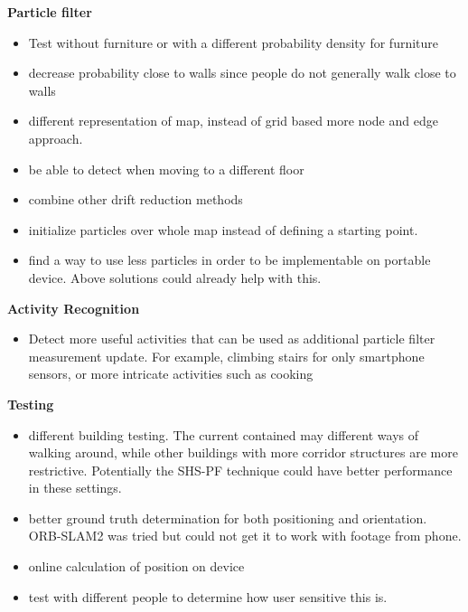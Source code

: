 {\textbf{Particle filter}
\begin{itemize}
	\item Test without furniture or with a different probability density for furniture
	\item decrease probability close to walls since people do not generally walk close to walls
	\item different representation of map, instead of grid based more node and edge approach. 
	\item be able to detect when moving to a different floor
	\item combine other drift reduction methods
	\item initialize particles over whole map instead of defining a starting point.
	\item find a way to use less particles in order to be implementable on portable device. Above solutions could already help with this.
\end{itemize}

\textbf{Activity Recognition}
\begin{itemize}
	\item Detect more useful activities that can be used as additional particle filter measurement update. For example, climbing stairs for only smartphone sensors, or more intricate activities such as cooking
\end{itemize}

\textbf{Testing}
\begin{itemize}
	\item different building testing. The current contained may different ways of walking around, while other buildings with more corridor structures are more restrictive. Potentially the SHS-PF technique could have better performance in these settings.
	\item better ground truth determination for both positioning and orientation. ORB-SLAM2 was tried but could not get it to work with footage from phone.
	\item online calculation of position on device
	\item test with different people to determine how user sensitive this is.
\end{itemize}}

